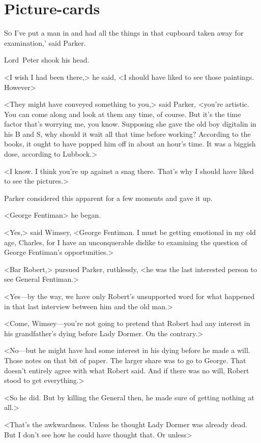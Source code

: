 \chapter{Picture-cards}

\lettrine[ante=‘]{S}{o} I've put a man in and had all the things in that cupboard taken away for examination,' said Parker.

\zz
Lord~Peter shook his head.

\zz
<I wish I had been there,> he said, <I should have liked to see those paintings. However\longdash>

<They might have conveyed something to you,> said Parker, <you're artistic. You can come along and look at them any time, of course. But it's the time factor that's worrying me, you know. Supposing she gave the old boy digitalin in his B and S, why should it wait all that time before working? According to the books, it ought to have popped him off in about an hour's time. It was a biggish dose, according to Lubbock.>

<I know. I think you're up against a snag there. That's why I should have liked to see the pictures.>

Parker considered this apparent  for a few moments and gave it up.

<George Fentiman\longdash> he began.

<Yes,> said Wimsey, <George Fentiman. I must be getting emotional in my old age, Charles, for I have an unconquerable dislike to examining the question of George Fentiman's opportunities.>

<Bar Robert,> pursued Parker, ruthlessly, <he was the last interested person to see General Fentiman.>

<Yes—by the way, we have only Robert's unsupported word for what happened in that last interview between him and the old man.>

<Come, Wimsey—you're not going to pretend that Robert had any interest in his grandfather's dying before Lady Dormer. On the contrary.>

<No—but he might have had some interest in his dying before he made a will. Those notes on that bit of paper. The larger share was to go to George. That doesn't entirely agree with what Robert said. And if there was no will, Robert stood to get everything.>

<So he did. But by killing the General then, he made sure of getting nothing at all.>

<That's the awkwardness. Unless he thought Lady Dormer was already dead. But I don't see how he could have thought that. Or unless\longdash>

